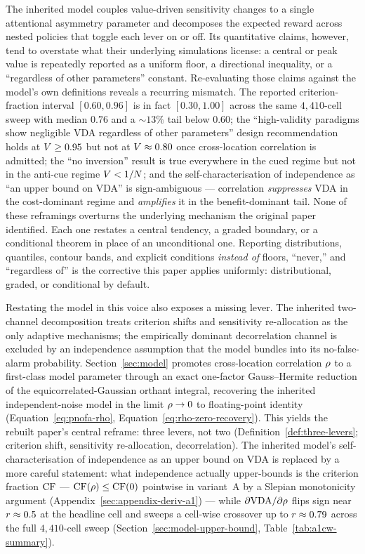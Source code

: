 The inherited model couples value-driven sensitivity changes to a
single attentional asymmetry parameter and decomposes the expected
reward across nested policies that toggle each lever on or off.  Its
quantitative claims, however, tend to overstate what their underlying
simulations license: a central or peak value is repeatedly reported
as a uniform floor, a directional inequality, or a
``regardless of other parameters'' constant.  Re-evaluating those
claims against the model's own definitions reveals a recurring
mismatch.  The reported criterion-fraction interval $[0.60, 0.96]$ is
in fact $[0.30, 1.00]$ across the same $4{,}410$-cell sweep with
median $0.76$ and a $\sim\!13\%$ tail below $0.60$; the
``high-validity paradigms show negligible VDA regardless of other
parameters'' design recommendation holds at $V \ge 0.95$ but
not at $V \approx 0.80$ once cross-location correlation is
admitted; the ``no inversion'' result is true everywhere in the cued
regime but not in the anti-cue regime $V < 1/N$; and the
self-characterisation of independence as ``an upper bound on VDA'' is
sign-ambiguous --- correlation \emph{suppresses} VDA in the
cost-dominant regime and \emph{amplifies} it in the
benefit-dominant tail.  None of these reframings overturns the
underlying mechanism the original paper identified.  Each one
restates a central tendency, a graded boundary, or a conditional
theorem in place of an unconditional one.  Reporting distributions,
quantiles, contour bands, and explicit conditions \emph{instead of}
floors, ``never,'' and ``regardless of'' is the corrective this paper
applies uniformly: distributional, graded, or conditional by default.

Restating the model in this voice also exposes a missing lever.  The
inherited two-channel decomposition treats criterion shifts and
sensitivity re-allocation as the only adaptive mechanisms; the
empirically dominant decorrelation channel
\cite{CohenMaunsell2009,
RuffCohen2016,
Srinath2021} is excluded by an
independence assumption that the model bundles into its
no-false-alarm probability.  Section~\ref{sec:model} promotes
cross-location correlation $\rho$ to a first-class model parameter
through an exact one-factor Gauss--Hermite reduction of the
equicorrelated-Gaussian orthant integral, recovering the inherited
independent-noise model in the limit $\rho \to 0$ to floating-point
identity (Equation~\eqref{eq:pnofa-rho},
Equation~\eqref{eq:rho-zero-recovery}).  This yields the rebuilt
paper's central reframe: three levers, not two
(Definition~\ref{def:three-levers}; criterion shift,
sensitivity re-allocation, decorrelation).  The inherited model's
self-characterisation of independence as an upper bound on VDA is
replaced by a more careful statement: what independence actually
upper-bounds is the criterion fraction $\mathrm{CF}$ ---
$\mathrm{CF}(\rho) \le \mathrm{CF}(0)$ pointwise in variant~A by a Slepian
monotonicity argument (Appendix~\ref{sec:appendix-deriv-a1}) --- while
$\partial \mathrm{VDA} / \partial \rho$ flips sign near $r \approx 0.5$
at the headline cell and sweeps a cell-wise crossover up to
$r \approx 0.79$ across the full $4{,}410$-cell sweep
(Section~\ref{sec:model-upper-bound},
Table~\ref{tab:a1cw-summary}).

